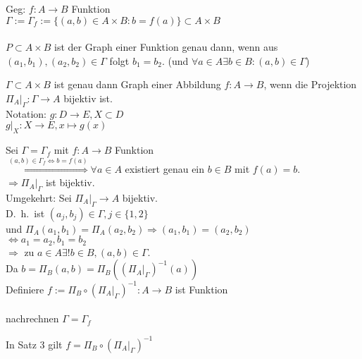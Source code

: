 \documentclass[../ana1.tex]{subfiles}
\begin{document}
\begin{defi}
	Geg: \(f: A \rightarrow B\) Funktion\\
	\(\Gamma := \Gamma_f := \{(a,b) \in A\times B : b = f(a)\} \subset A\times B\) \\
	\quad
	\\
	\(P\subset A\times B\) ist der Graph einer Funktion genau dann, wenn aus \((a_1,b_1), (a_2,b_2) \in \Gamma \) folgt \(b_1 = b_2\). (und \(\forall a\in A \exists b\in B:(a,b)\in\Gamma \))
\end{defi}

\begin{satz}
	\(\Gamma \subset A\times B\) ist genau dann Graph einer Abbildung \(f: A\rightarrow B\), wenn die Projektion \(\Pi_A \vert_\Gamma : \Gamma \rightarrow A\) bijektiv ist.\\
	Notation: \(g: D \rightarrow E, X\subset D\) \\
	\(g\vert_X: X\rightarrow E, x\mapsto g(x)\) \\
\end{satz}
\begin{bew}
	Sei \(\Gamma = \Gamma_f \) mit \(f: A\rightarrow B\) Funktion\\
	\(\overset{(a,b)\in \Gamma_f \Leftrightarrow b = f(a)}{\Rightarrow} \forall a\in A\) existiert genau ein \(b\in B\) mit \(f(a) = b\).\\
	\(\Rightarrow \Pi_A \vert_\Gamma \) ist bijektiv.\\
	Umgekehrt: Sei \(\Pi_A \vert_\Gamma \rightarrow A\) bijektiv.\\
	D.\ h.\ ist \( (a_j, b_j) \in \Gamma, j \in \{1,2\} \) \\
	und \( \Pi_A(a_1, b_1) = \Pi_A(a_2, b_2) \Rightarrow (a_1, b_1) = (a_2, b_2)\) \\
	\(\Leftrightarrow a_1 = a_2, b_1 = b_2\) \\
	\(\Rightarrow \) zu \(a\in A \exists ! b\in B, (a,b) \in \Gamma \).\\
	Da \( b=\Pi_B(a,b) = \Pi_B({(\Pi_A\vert_\Gamma)}^{-1}(a)) \) \\
	Definiere \(f:= \Pi_B \circ {(\Pi_A\vert_\Gamma)}^{-1}:A\rightarrow B\) ist Funktion\\
	\\
	nachrechnen \( \Gamma = \Gamma_f \)
\end{bew}

\begin{bem}
	In Satz 3 gilt \(f = \Pi_B \circ {(\Pi_A\vert_\Gamma)}^{-1} \) %
\end{bem}
\end{document}
